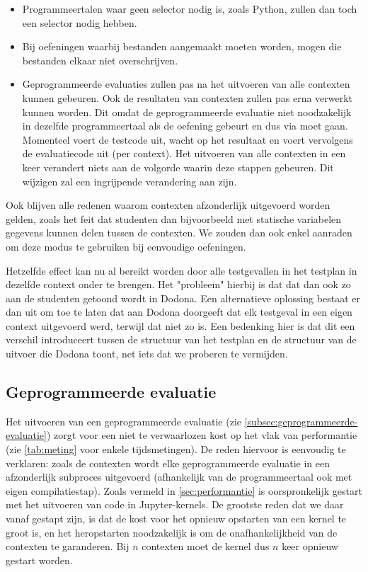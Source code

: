 \begin{itemize}
    \item Programmeertalen waar geen selector nodig is, zoals Python, zullen dan toch een selector nodig hebben.
    \item Bij oefeningen waarbij bestanden aangemaakt moeten worden, mogen die bestanden elkaar niet overschrijven.
    \item Geprogrammeerde evaluaties zullen pas na het uitvoeren van alle contexten kunnen gebeuren.
    Ook de resultaten van contexten zullen pas erna verwerkt kunnen worden.
    Dit omdat de geprogrammeerde evaluatie niet noodzakelijk in dezelfde programmeertaal als de oefening gebeurt en dus via \tested{} moet gaan.
    Momenteel voert \tested{} de testcode uit, wacht op het resultaat en voert vervolgens de evaluatiecode uit (per context).
    Het uitvoeren van alle contexten in een keer verandert niets aan de volgorde waarin deze stappen gebeuren.
    Dit wijzigen zal een ingrijpende verandering aan \tested{} zijn.
\end{itemize}

Ook blijven alle redenen waarom contexten afzonderlijk uitgevoerd worden gelden, zoals het feit dat studenten dan bijvoorbeeld met statische variabelen gegevens kunnen delen tussen de contexten.
We zouden dan ook enkel aanraden om deze modus te gebruiken bij eenvoudige oefeningen.

Hetzelfde effect kan nu al bereikt worden door alle testgevallen in het testplan in dezelfde context onder te brengen.
Het "probleem" hierbij is dat dat dan ook zo aan de studenten getoond wordt in Dodona.
Een alternatieve oplossing bestaat er dan uit om toe te laten dat \tested{} aan Dodona doorgeeft dat elk testgeval in een eigen context uitgevoerd werd, terwijl dat niet zo is.
Een bedenking hier is dat dit een verschil introduceert tussen de structuur van het testplan en de structuur van de uitvoer die Dodona toont, net iets dat we proberen te vermijden.

\subsection{Geprogrammeerde evaluatie}\label{subsec:geprogrammeerde-evaluatie-is-traag}

Het uitvoeren van een geprogrammeerde evaluatie (zie \cref{subsec:geprogrammeerde-evaluatie}) zorgt voor een niet te verwaarlozen kost op het vlak van performantie (zie \cref{tab:meting} voor enkele tijdsmetingen).
De reden hiervoor is eenvoudig te verklaren: zoals de contexten wordt elke geprogrammeerde evaluatie in een afzonderlijk subproces uitgevoerd (afhankelijk van de programmeertaal ook met eigen compilatiestap).
Zoals vermeld in \cref{sec:performantie} is \tested{} oorspronkelijk gestart met het uitvoeren van code in Jupyter-kernels.
De grootste reden dat we daar vanaf gestapt zijn, is dat de kost voor het opnieuw opstarten van een kernel te groot is, en het heropstarten noodzakelijk is om de onafhankelijkheid van de contexten te garanderen.
Bij $n$ contexten moet de kernel dus $n$ keer opnieuw gestart worden.


